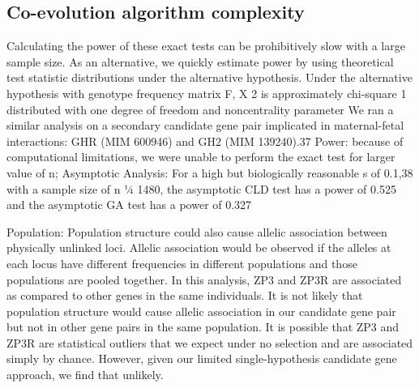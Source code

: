 \subsection{Co-evolution algorithm complexity}
Calculating the power of these exact tests can be prohibitively slow with a large sample size. As an alternative, we quickly estimate power by using theoretical test statistic distributions under the alternative hypothesis. Under the alternative hypothesis with genotype frequency matrix F, X 2 is approximately chi-square 1 distributed with one degree of freedom and noncentrality parameter \cite{rohlfs2010detecting}
We ran a similar analysis on a secondary candidate gene pair implicated in maternal-fetal interactions: GHR (MIM 600946) and GH2 (MIM 139240).37 \cite{rohlfs2010detecting}
Power: because of computational limitations, we were unable to perform the exact test for larger value of n;  \cite{rohlfs2010detecting}
Asymptotic Analysis: For a high but biologically reasonable s of 0.1,38 with a sample size of n 1⁄4 1480, the asymptotic CLD test has a power of 0.525 and the asymptotic GA test has a power of 0.327 \cite{rohlfs2010detecting}

Population: Population structure could also cause allelic association between physically unlinked loci.  \cite{rohlfs2010detecting}
Allelic association would be observed if the alleles at each locus have different frequencies in different populations and those populations are pooled together. In this analysis, ZP3 and ZP3R are associated as compared to other genes in the same individuals. It is not likely that population structure would cause allelic association in our candidate gene pair but not in other gene pairs in the same population. It is possible that ZP3 and ZP3R are statistical outliers that we expect under no selection and are associated simply by chance. However, given our limited single-hypothesis candidate gene approach, we find that unlikely. \cite{rohlfs2010detecting}

